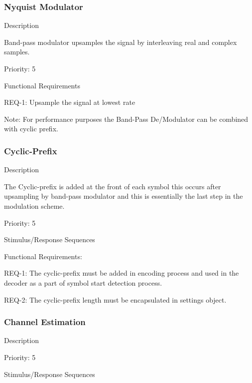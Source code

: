 \documentclass[]{report}
\begin{document}
\subsubsection{Nyquist Modulator}

Description \par
Band-pass modulator upsamples the signal by interleaving real and complex samples. \par

Priority: 5 \par

Functional Requirements \par
REQ-1: Upsample the signal at lowest rate \par

Note: For performance purposes the Band-Pass De/Modulator can be combined with cyclic prefix.\par


\subsubsection{Cyclic-Prefix}

Description\par
The Cyclic-prefix is added at the front of each symbol this occurs after upsampling by band-pass modulator and this is essentially the last step in the modulation scheme. \par

Priority: 5  \par
 
Stimulus/Response Sequences \par

Functional Requirements:\par
REQ-1: The cyclic-prefix must be added in encoding process and used in the decoder as a part of symbol start detection process. \par 
REQ-2: The cyclic-prefix length must be encapsulated in settings object. \par


\subsubsection{Channel Estimation}

Description \par
\par

Priority: 5  \par

Stimulus/Response Sequences \par
\end{document}

